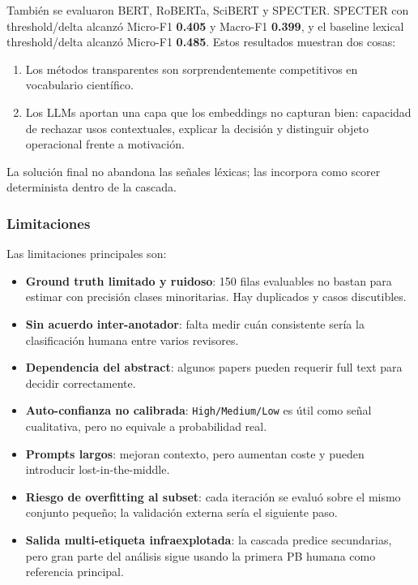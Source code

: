 También se evaluaron BERT, RoBERTa, SciBERT y SPECTER. SPECTER con threshold/delta alcanzó Micro-F1 \textbf{0.405} y Macro-F1 \textbf{0.399}, y el baseline lexical threshold/delta alcanzó Micro-F1 \textbf{0.485}. Estos resultados muestran dos cosas:

\begin{enumerate}
\item Los métodos transparentes son sorprendentemente competitivos en vocabulario científico.
\item Los LLMs aportan una capa que los embeddings no capturan bien: capacidad de rechazar usos contextuales, explicar la decisión y distinguir objeto operacional frente a motivación.
\end{enumerate}

La solución final no abandona las señales léxicas; las incorpora como scorer determinista dentro de la cascada.

\subsubsection*{Limitaciones}

Las limitaciones principales son:

\begin{itemize}
\item \textbf{Ground truth limitado y ruidoso}: 150 filas evaluables no bastan para estimar con precisión clases minoritarias. Hay duplicados y casos discutibles.
\item \textbf{Sin acuerdo inter-anotador}: falta medir cuán consistente sería la clasificación humana entre varios revisores.
\item \textbf{Dependencia del abstract}: algunos papers pueden requerir full text para decidir correctamente.
\item \textbf{Auto-confianza no calibrada}: \texttt{High/Medium/Low} es útil como señal cualitativa, pero no equivale a probabilidad real.
\item \textbf{Prompts largos}: mejoran contexto, pero aumentan coste y pueden introducir lost-in-the-middle.
\item \textbf{Riesgo de overfitting al subset}: cada iteración se evaluó sobre el mismo conjunto pequeño; la validación externa sería el siguiente paso.
\item \textbf{Salida multi-etiqueta infraexplotada}: la cascada predice secundarias, pero gran parte del análisis sigue usando la primera PB humana como referencia principal.
\end{itemize}

